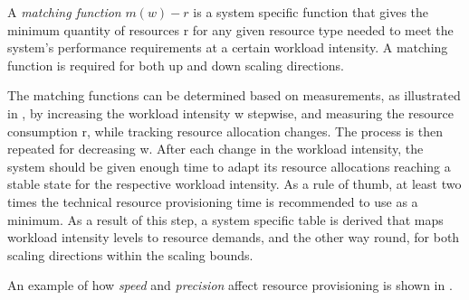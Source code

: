 A \textit{matching function} $m(w) - r$ is a system specific function that gives the minimum quantity of resources r for any given resource type needed to meet the system’s performance requirements at a certain workload intensity. A matching function is required for both up and down scaling directions.

The matching functions can be determined based on measurements, as illustrated in , by increasing the workload intensity w stepwise, and measuring the resource consumption r, while tracking resource allocation changes. The process is then repeated for decreasing w. After each change in the workload intensity, the system should be given enough time to adapt its resource allocations reaching a stable state for the respective workload intensity. As a rule of thumb, at least two times the technical resource provisioning time is recommended to use as a minimum. As a result of this step, a system specific table is derived that maps workload intensity levels to resource demands, and the other way round, for both scaling directions within the scaling bounds.

An example of how \textit{speed} and \textit{precision} affect resource provisioning is shown in .


